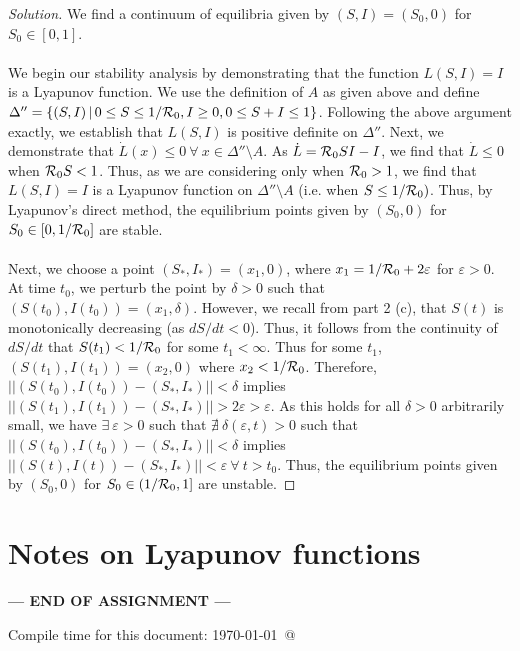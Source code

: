 \documentclass[12pt]{article}
\begin{document}
\begin{enumerate}[(a)]
{\begin{proof}[Solution]
We find a continuum of equilibria given by $(S,I)=(S_0,0)$ for $S_0 \in [0,1]$. \\
\\
We begin our stability analysis by demonstrating that the function $L(S,I)=I$ is a Lyapunov function. We use the definition of $A$ as given above and define $\Delta'' = \{ (S, I) \, | \, 0 \leq S \leq 1/{\cal R}_0, I \geq 0, 0 \leq S+I \leq 1 \}$. Following the above argument exactly, we establish that $L(S,I)$ is positive definite on $\Delta''$. Next, we demonstrate that $\dot{L}(x) \leq 0 \ \forall \ x \in \Delta'' \setminus A$. As $\dot{L}={\cal R}_0 S I -I$, we find that $\dot{L} \leq 0$ when ${\cal R}_0S<1$. Thus, as we are considering only when ${\cal R}_0>1$, we find that $L(S,I)=I$ is a Lyapunov function on $\Delta'' \setminus A$ (i.e. when $S \leq 1/{\cal R}_0)$. Thus, by Lyapunov's direct method, the equilibrium points given by $(S_0, 0)$ for $S_0 \in [0, 1/{\cal R}_0]$ are stable. 
\\\\
Next, we choose a point $(S_\ast,I_\ast)=(x_1 ,0)$, where $x_1=1/{\cal R}_0 + 2\varepsilon$ for $\varepsilon >0$. At time $t_0$, we perturb the point by $\delta >0$ such that $(S(t_0),I(t_0))=(x_1 ,\delta)$. However, we recall from part 2 (c), that $S(t)$ is monotonically decreasing (as $dS/dt<0$). Thus, it follows from the continuity of $dS/dt$ that $S(t_1) < 1/{\cal R}_0$ for some $t_1 < \infty$. Thus for some $t_1$, $(S(t_1),I(t_1))=(x_2 ,0)$ where $x_2 < 1/{\cal R}_0$. Therefore, $||(S(t_0), I(t_0))-(S_\ast, I_\ast)||<\delta$ implies $||(S(t_1), I(t_1))-(S_\ast, I_\ast)||>2\varepsilon >\varepsilon$.  As this holds for all $\delta>0$ arbitrarily small, we have $\exists \ \varepsilon>0$ such that $\nexists \ \delta(\varepsilon,t)>0$ such that $||(S(t_0), I(t_0))-(S_\ast, I_\ast)||<\delta$ implies $||(S(t), I(t))-(S_\ast, I_\ast)||<\varepsilon \ \forall \ t>t_0$. Thus, the equilibrium points given by $(S_0,0)$ for $S_0 \in \left(1/{\cal R}_0, 1\right]$ are unstable.
\end{proof}
}

\end{enumerate}

\newpage
\section*{Notes on Lyapunov functions}\hypertarget{NotesLyapFuns}{}

\NotesOnLyapunovFunctions




\bigskip

\centerline{\bf--- END OF ASSIGNMENT ---}

\bigskip
Compile time for this document:
\today\ @ \thistime
\end{document}
